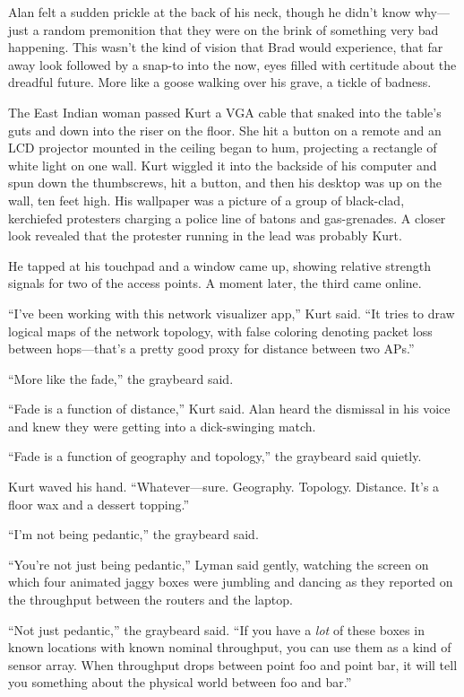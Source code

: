 \documentclass{article}
\begin{document}
Alan felt a sudden prickle at the back of his neck, though he didn't
know why---just a random premonition that they were on the brink of
something very bad happening.  This wasn't the kind of vision that
Brad would experience, that far away look followed by a snap-to into
the now, eyes filled with certitude about the dreadful future.  More
like a goose walking over his grave, a tickle of badness.

The East Indian woman passed Kurt a VGA cable that snaked into the
table's guts and down into the riser on the floor.  She hit a button
on a remote and an LCD projector mounted in the ceiling began to hum,
projecting a rectangle of white light on one wall.  Kurt wiggled it
into the backside of his computer and spun down the thumbscrews, hit a
button, and then his desktop was up on the wall, ten feet high.  His
wallpaper was a picture of a group of black-clad, kerchiefed
protesters charging a police line of batons and gas-grenades.  A
closer look revealed that the protester running in the lead was
probably Kurt.

He tapped at his touchpad and a window came up, showing relative
strength signals for two of the access points.  A moment later, the
third came online.

``I've been working with this network visualizer app,'' Kurt said. 
``It tries to draw logical maps of the network topology, with false
coloring denoting packet loss between hops---that's a pretty good
proxy for distance between two APs.''

``More like the fade,'' the graybeard said.

``Fade is a function of distance,'' Kurt said.  Alan heard the
dismissal in his voice and knew they were getting into a dick-swinging
match.

``Fade is a function of geography and topology,'' the graybeard said
quietly.

Kurt waved his hand.  ``Whatever---sure.  Geography.  Topology. 
Distance.  It's a floor wax and a dessert topping.''

``I'm not being pedantic,'' the graybeard said.

``You're not just being pedantic,'' Lyman said gently, watching the
screen on which four animated jaggy boxes were jumbling and dancing as
they reported on the throughput between the routers and the laptop.

``Not just pedantic,'' the graybeard said.  ``If you have a
\textit{lot} of these boxes in known locations with known nominal
throughput, you can use them as a kind of sensor array.  When
throughput drops between point foo and point bar, it will tell you
something about the physical world between foo and bar.''
\end{document}
